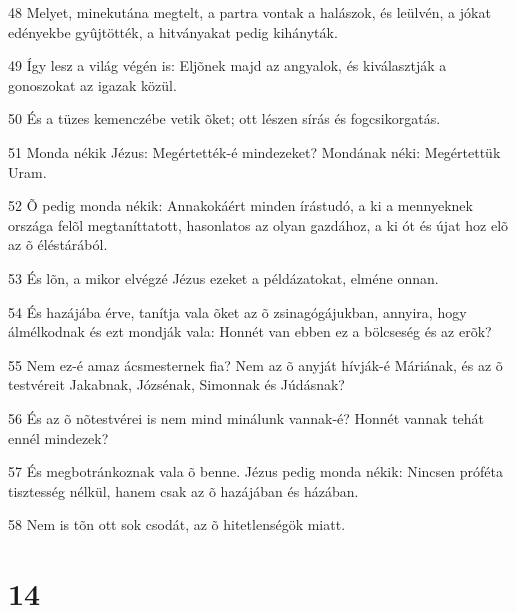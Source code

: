 \par 48 Melyet, minekutána megtelt, a partra vontak a halászok, és leülvén, a jókat edényekbe gyûjtötték, a hitványakat pedig kihányták.
\par 49 Így lesz a világ végén is: Eljõnek majd az angyalok, és kiválasztják a gonoszokat az igazak közül.
\par 50 És a tüzes kemenczébe vetik õket; ott lészen sírás és fogcsikorgatás.
\par 51 Monda nékik Jézus: Megértették-é mindezeket? Mondának néki: Megértettük Uram.
\par 52 Õ pedig monda nékik: Annakokáért minden írástudó, a ki a mennyeknek országa felõl megtaníttatott, hasonlatos az olyan gazdához, a ki ót és újat hoz elõ az õ éléstárából.
\par 53 És lõn, a mikor elvégzé Jézus ezeket a példázatokat, elméne onnan.
\par 54 És hazájába érve, tanítja vala õket az õ zsinagógájukban, annyira, hogy álmélkodnak és ezt mondják vala: Honnét van ebben ez a bölcseség és az erõk?
\par 55 Nem ez-é amaz ácsmesternek fia? Nem az õ anyját hívják-é Máriának, és az õ testvéreit Jakabnak, Józsénak, Simonnak és Júdásnak?
\par 56 És az õ nõtestvérei is nem mind minálunk vannak-é? Honnét vannak tehát ennél mindezek?
\par 57 És megbotránkoznak vala õ benne. Jézus pedig monda nékik: Nincsen próféta tisztesség nélkül, hanem csak az õ hazájában és házában.
\par 58 Nem is tõn ott sok csodát, az õ hitetlenségök miatt.

\chapter{14}


